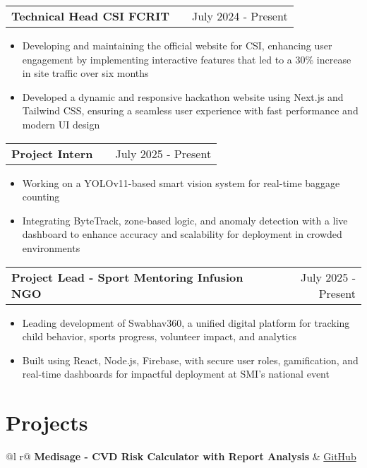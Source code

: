 \documentclass[a4paper,12pt]{article}
\makeatletter
\newenvironment{joblong}[2]
    {
    \begin{tabularx}{\linewidth}{@{}l X r@{}}
    \textbf{#1} & \hfill &  #2 \\[3.75pt]
    \end{tabularx}
    \begin{minipage}[t]{\linewidth}
    \begin{itemize}[nosep,after=\strut, leftmargin=1em, itemsep=3pt,label=--]
    }
    {
    \end{itemize}
    \end{minipage}    
    }
\makeatother
\begin{document}
\begin{joblong}{Technical Head CSI FCRIT}{July 2024 - Present}
\textbf{Fr.C. Rodrigues Institute of Technology, Vashi}
\item Developing and maintaining the official website for CSI, enhancing user engagement by implementing interactive features that led to a 30\% increase in site traffic over six months
\item Developed a dynamic and responsive hackathon website using Next.js and Tailwind CSS, ensuring a seamless user experience with fast performance and modern UI design
\end{joblong}

\begin{joblong}{Project Intern}{July 2025 - Present}
\textbf{IISER x Suraj Informatics}
\item Working on a YOLOv11-based smart vision system for real-time baggage counting
\item Integrating ByteTrack, zone-based logic, and anomaly detection with a live dashboard to enhance accuracy and scalability for deployment in crowded environments
\end{joblong}

\begin{joblong}{Project Lead - Sport Mentoring Infusion NGO}{July 2025 - Present}
\item Leading development of Swabhav360, a unified digital platform for tracking child behavior, sports progress, volunteer impact, and analytics
\item Built using React, Node.js, Firebase, with secure user roles, gamification, and real-time dashboards for impactful deployment at SMI's national event
\end{joblong}

\section{Projects}

\begin{tabularx}{\linewidth}{ @{}l r@{} }
\textbf{Medisage - CVD Risk Calculator with Report Analysis} & \hfill \href{https://github.com}{GitHub} \\[3.75pt]
  \\
\end{tabularx}
\end{document}
